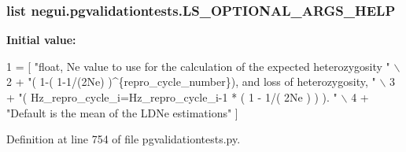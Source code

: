 \subsubsection[{\texorpdfstring{L\+S\+\_\+\+O\+P\+T\+I\+O\+N\+A\+L\+\_\+\+A\+R\+G\+S\+\_\+\+H\+E\+LP}{LS_OPTIONAL_ARGS_HELP}}]{\setlength{\rightskip}{0pt plus 5cm}list negui.\+pgvalidationtests.\+L\+S\+\_\+\+O\+P\+T\+I\+O\+N\+A\+L\+\_\+\+A\+R\+G\+S\+\_\+\+H\+E\+LP}\hypertarget{namespacenegui_1_1pgvalidationtests_a9514244efc3e661ac3ca4356f14fdfa9}{}\label{namespacenegui_1_1pgvalidationtests_a9514244efc3e661ac3ca4356f14fdfa9}
{\bfseries Initial value\+:}
\begin{DoxyCode}
1 = [ \textcolor{stringliteral}{"float, Ne value to use for the calculation of the expected heterozygosity "} \(\backslash\)
2                                 + \textcolor{stringliteral}{"( 1-( 1-1/(2Ne) )^\{repro\_cycle\_number\}), and loss of heterozygosity, "} \(\backslash\)
3                                 + \textcolor{stringliteral}{"( Hz\_repro\_cycle\_i=Hz\_repro\_cycle\_i-1 * ( 1 - 1/( 2Ne ) ) ).  "} \(\backslash\)
4                                 + \textcolor{stringliteral}{"Default is the mean of the LDNe estimations"} ]
\end{DoxyCode}


Definition at line 754 of file pgvalidationtests.\+py.

